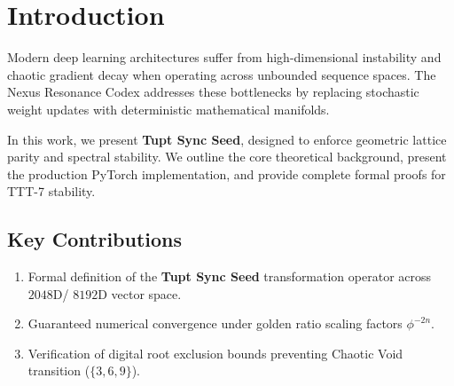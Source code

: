\section{Introduction}
Modern deep learning architectures suffer from high-dimensional instability and chaotic gradient decay when operating across unbounded sequence spaces. The Nexus Resonance Codex addresses these bottlenecks by replacing stochastic weight updates with deterministic mathematical manifolds.

In this work, we present \textbf{Tupt Sync Seed}, designed to enforce geometric lattice parity and spectral stability. We outline the core theoretical background, present the production PyTorch implementation, and provide complete formal proofs for TTT-7 stability.

\subsection{Key Contributions}
\begin{enumerate}[label=\textbf{\arabic*.}]
    \item Formal definition of the \textbf{Tupt Sync Seed} transformation operator across $2048$D/ $8192$D vector space.
    \item Guaranteed numerical convergence under golden ratio scaling factors $\phi^{-2n}$.
    \item Verification of digital root exclusion bounds preventing Chaotic Void transition ($\{3, 6, 9\}$).
\end{enumerate}